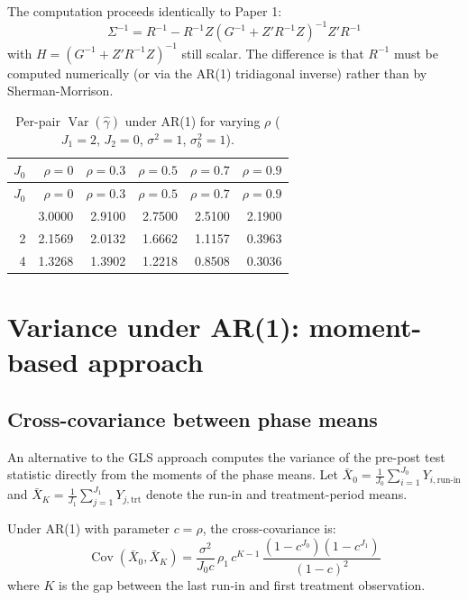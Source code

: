 \documentclass[
  11pt,
]{article}
\begin{document}
The computation proceeds identically to Paper 1: \begin{equation}
  \Sigma^{-1} = R^{-1} - R^{-1}Z
    (G^{-1} + Z'R^{-1}Z)^{-1} Z'R^{-1}
\end{equation} with \(H = (G^{-1} + Z'R^{-1}Z)^{-1}\) still scalar. The
difference is that \(R^{-1}\) must be computed numerically (or via the
AR(1) tridiagonal inverse) rather than by Sherman-Morrison.

\begin{longtable}[]{@{}rrrrrr@{}}
\caption{Per-pair \(\mathop{\mathrm{Var}}(\hat\gamma)\) under AR(1) for
varying \(\rho\) (\(J_1=2\), \(J_2=0\), \(\sigma^2=1\),
\(\sigma_b^2=1\)).}\tabularnewline
\toprule\noalign{}
\(J_0\) & \(\rho=0\) & \(\rho=0.3\) & \(\rho=0.5\) & \(\rho=0.7\) &
\(\rho=0.9\) \\
\midrule\noalign{}
\endfirsthead
\toprule\noalign{}
\(J_0\) & \(\rho=0\) & \(\rho=0.3\) & \(\rho=0.5\) & \(\rho=0.7\) &
\(\rho=0.9\) \\
\midrule\noalign{}
\endhead
\bottomrule\noalign{}
\endlastfoot
0 & 3.0000 & 2.9100 & 2.7500 & 2.5100 & 2.1900 \\
2 & 2.1569 & 2.0132 & 1.6662 & 1.1157 & 0.3963 \\
4 & 1.3268 & 1.3902 & 1.2218 & 0.8508 & 0.3036 \\
\end{longtable}

\section{Variance under AR(1): moment-based
approach}\label{variance-under-ar1-moment-based-approach}

\subsection{Cross-covariance between phase
means}\label{cross-covariance-between-phase-means}

An alternative to the GLS approach computes the variance of the pre-post
test statistic directly from the moments of the phase means. Let
\(\bar{X}_0 = \frac{1}{J_0}\sum_{i=1}^{J_0} Y_{i,\text{run-in}}\) and
\(\bar{X}_K = \frac{1}{J_1}\sum_{j=1}^{J_1} Y_{j,\text{trt}}\) denote
the run-in and treatment-period means.

Under AR(1) with parameter \(c = \rho\), the cross-covariance is:
\begin{equation}
  \mathop{\mathrm{Cov}}(\bar{X}_0, \bar{X}_K)
  = \frac{\sigma^2}{J_0 c}\,\rho_1\, c^{K-1}\,
    \frac{(1 - c^{J_0})(1 - c^{J_1})}{(1 - c)^2}
\end{equation} where \(K\) is the gap between the last run-in and first
treatment observation.
\end{document}
